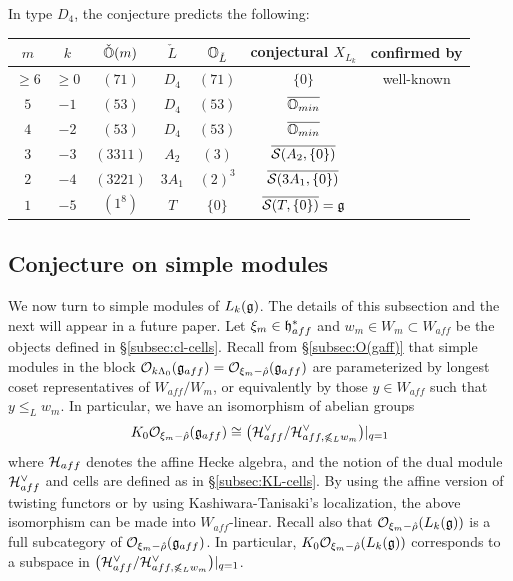 \documentclass[reqno]{amsart}
\begin{document}
\begin{example}
	In type $D_4$, the conjecture predicts the following:
	\begin{center}
		\begin{tabular}{ccccccc}
			\hline $m$ & $k$  & $\check {\mathbb{O}}(m)$ & $\check L$ & $\mathbb{O}_{\check L}$ & conjectural $X_{L_k}$ & confirmed by
			\\ \hline
			$\ge6$ & $\ge0$   & $(71)$ & $D_4$ & $(71)$ & $\{0\}$ & well-known\\
			$5$ & $-1$  & $(53)$ & $D_4$ & $(53)$ & $\overline{\mathbb{O}_{min}}$ & \cite{Arakawa-Moreau:Omin}\\
			$4$ & $-2$   & $(53)$ & $D_4$ & $(53)$ & $\overline{\mathbb{O}_{min}}$ & \cite{Arakawa-Moreau:Omin}\\
			$3$ & $-3$   & $(3311)$ & $A_2$ & $(3)$ & $\overline{\mathcal{S}(A_2, \{0\})}$\\
			$2$ & $-4$  & $(3221)$ & $3A_1$ & $(2)^3$ & $\overline{\mathcal{S}(3A_1, \{0\})}$\\
			$1$ & $-5$   & $(1^8)$ & $T$ & $\{0\}$ & $\overline{\mathcal{S}(T,\{0\})} =\mathfrak{g}$ & \cite{Gorelik-Kac}
		\end{tabular}
	\end{center}
\end{example}

\subsection{Conjecture on simple modules}

We now turn to simple modules of $L_k(\mathfrak{g})$. The details of this subsection and the next will appear in a future paper. Let $\xi_m \in \mathfrak{h}_{aff}^*$ and $w_m \in W_m \subset W_{aff}$ be the objects defined in \S\ref{subsec:cl-cells}. Recall from \S\ref{subsec:O(gaff)} that simple modules in the block $\mathcal{O}_{k\Lambda_0}(\mathfrak{g}_{aff}) = \mathcal{O}_{\xi_m - \hat \rho}(\mathfrak{g}_{aff})$ are parameterized by longest coset representatives of $W_{aff}/W_m$, or equivalently by those $y \in W_{aff}$ such that $y \le_L w_m$. In particular, we have an isomorphism of abelian groups
\begin{equation*}
	K_0 \mathcal{O}_{\xi_m - \hat \rho}(\mathfrak{g}_{aff}) \cong \big( \mathcal{H}_{aff}^\vee/ \mathcal{H}_{aff, \not\leqslant_L w_m}^\vee \big)|_{q=1}
\end{equation*}
where $\mathcal{H}_{aff}$ denotes the affine Hecke algebra, and the notion of the dual module $\mathcal{H}_{aff}^\vee$ and cells are defined as in \S \ref{subsec:KL-cells}. By using the affine version of twisting functors or by using Kashiwara-Tanisaki's localization, the above isomorphism can be made into $W_{aff}$-linear. Recall also that $\mathcal{O}_{\xi_m - \hat \rho}(L_k(\mathfrak{g}))$ is a full subcategory of $\mathcal{O}_{\xi_m - \hat \rho}(\mathfrak{g}_{aff})$. In particular, $K_0 \mathcal{O}_{\xi_m - \hat \rho}(L_k(\mathfrak{g}))$ corresponds to a subspace in $\big( \mathcal{H}_{aff}^\vee/ \mathcal{H}_{aff, \not\leqslant_L w_m}^\vee \big)|_{q=1}$.
\end{document}
